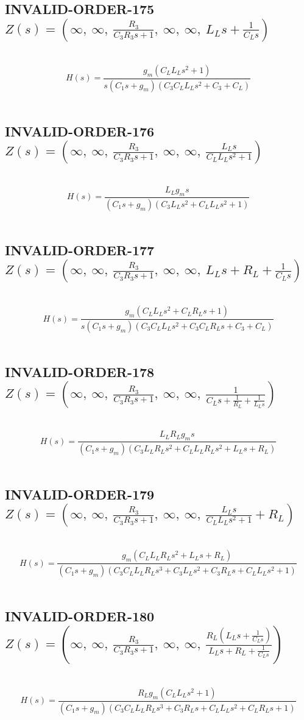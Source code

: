 \documentclass{article}
\begin{document}
\subsection{INVALID-ORDER-175 $Z(s) = \left( \infty, \  \infty, \  \frac{R_{3}}{C_{3} R_{3} s + 1}, \  \infty, \  \infty, \  L_{L} s + \frac{1}{C_{L} s}\right)$ } \ 
\textbf{\[H(s) = \frac{g_{m} \left(C_{L} L_{L} s^{2} + 1\right)}{s \left(C_{1} s + g_{m}\right) \left(C_{3} C_{L} L_{L} s^{2} + C_{3} + C_{L}\right)}\] } \ 
\subsection{INVALID-ORDER-176 $Z(s) = \left( \infty, \  \infty, \  \frac{R_{3}}{C_{3} R_{3} s + 1}, \  \infty, \  \infty, \  \frac{L_{L} s}{C_{L} L_{L} s^{2} + 1}\right)$ } \ 
\textbf{\[H(s) = \frac{L_{L} g_{m} s}{\left(C_{1} s + g_{m}\right) \left(C_{3} L_{L} s^{2} + C_{L} L_{L} s^{2} + 1\right)}\] } \ 
\subsection{INVALID-ORDER-177 $Z(s) = \left( \infty, \  \infty, \  \frac{R_{3}}{C_{3} R_{3} s + 1}, \  \infty, \  \infty, \  L_{L} s + R_{L} + \frac{1}{C_{L} s}\right)$ } \ 
\textbf{\[H(s) = \frac{g_{m} \left(C_{L} L_{L} s^{2} + C_{L} R_{L} s + 1\right)}{s \left(C_{1} s + g_{m}\right) \left(C_{3} C_{L} L_{L} s^{2} + C_{3} C_{L} R_{L} s + C_{3} + C_{L}\right)}\] } \ 
\subsection{INVALID-ORDER-178 $Z(s) = \left( \infty, \  \infty, \  \frac{R_{3}}{C_{3} R_{3} s + 1}, \  \infty, \  \infty, \  \frac{1}{C_{L} s + \frac{1}{R_{L}} + \frac{1}{L_{L} s}}\right)$ } \ 
\textbf{\[H(s) = \frac{L_{L} R_{L} g_{m} s}{\left(C_{1} s + g_{m}\right) \left(C_{3} L_{L} R_{L} s^{2} + C_{L} L_{L} R_{L} s^{2} + L_{L} s + R_{L}\right)}\] } \ 
\subsection{INVALID-ORDER-179 $Z(s) = \left( \infty, \  \infty, \  \frac{R_{3}}{C_{3} R_{3} s + 1}, \  \infty, \  \infty, \  \frac{L_{L} s}{C_{L} L_{L} s^{2} + 1} + R_{L}\right)$ } \ 
\textbf{\[H(s) = \frac{g_{m} \left(C_{L} L_{L} R_{L} s^{2} + L_{L} s + R_{L}\right)}{\left(C_{1} s + g_{m}\right) \left(C_{3} C_{L} L_{L} R_{L} s^{3} + C_{3} L_{L} s^{2} + C_{3} R_{L} s + C_{L} L_{L} s^{2} + 1\right)}\] } \ 
\subsection{INVALID-ORDER-180 $Z(s) = \left( \infty, \  \infty, \  \frac{R_{3}}{C_{3} R_{3} s + 1}, \  \infty, \  \infty, \  \frac{R_{L} \left(L_{L} s + \frac{1}{C_{L} s}\right)}{L_{L} s + R_{L} + \frac{1}{C_{L} s}}\right)$ } \ 
\textbf{\[H(s) = \frac{R_{L} g_{m} \left(C_{L} L_{L} s^{2} + 1\right)}{\left(C_{1} s + g_{m}\right) \left(C_{3} C_{L} L_{L} R_{L} s^{3} + C_{3} R_{L} s + C_{L} L_{L} s^{2} + C_{L} R_{L} s + 1\right)}\] } \ 
\end{document}
